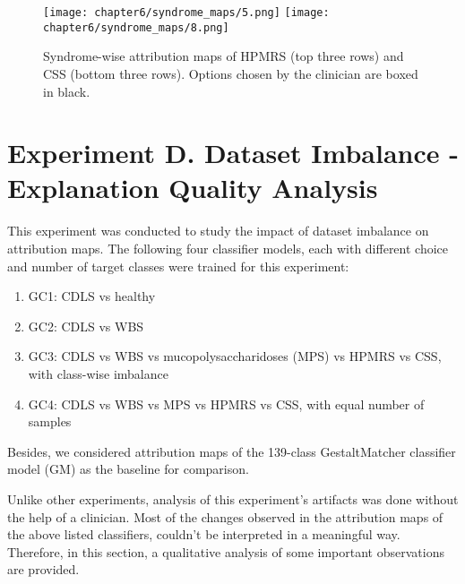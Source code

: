 \documentclass[../report.tex]{subfiles}
\begin{document}
            \begin{sidewaysfigure}
    	\texttt{[image: chapter6/syndrome\_maps/5.png]}
    	    	\texttt{[image: chapter6/syndrome\_maps/8.png]}
    	
    	\caption[Syndrome-wise attribution maps of HPMRS and CSS]{Syndrome-wise attribution maps of HPMRS (top three rows) and CSS (bottom three rows). Options chosen by the clinician are boxed in black.}
    	\label{fig_synd_map_2}	
    \end{sidewaysfigure}
    \clearpage
	\section{Experiment D. Dataset Imbalance - Explanation Quality Analysis}
	This experiment was conducted to study the impact of dataset imbalance on attribution maps. The following four classifier models, each with different choice and number of target classes were trained for this experiment:
	\begin{enumerate}
		\item GC1: CDLS vs healthy 
		\item GC2: CDLS vs WBS
		\item GC3: CDLS vs WBS vs mucopolysaccharidoses (MPS) vs HPMRS vs CSS, with class-wise imbalance 
		\item GC4: CDLS vs WBS vs MPS vs HPMRS vs CSS, with equal number of samples
	\end{enumerate}
	Besides, we considered attribution maps of the 139-class GestaltMatcher classifier model (GM) as the baseline for comparison.
	
	 Unlike other experiments, analysis of this experiment's artifacts was done without the help of a clinician. 	 Most of the changes observed in the attribution maps of the above listed classifiers, couldn't be interpreted in a meaningful way. Therefore, in this section, a qualitative analysis of some important observations are provided.
	 	
\end{document}
